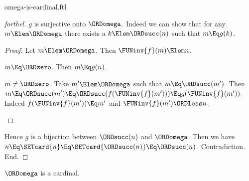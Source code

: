 \documentclass{stex}
\begin{document}
\begin{smodule}{omega-is-cardinal.ftl}
\begin{proof}[forthel]
    $g$ is surjective onto $\ORDomega$.
    Indeed we can show that for any $m \Elem \ORDomega$ there exists a $k \Elem \ORDsucc(n)$ such that $m \Eq g(k)$.
    \begin{proof}
      Let $m \Elem \ORDomega$.
      Then $\FUNinv{f}(m) \Elem n$.

      \begin{case}{$m \Eq \ORDzero$.}
        Then $m \Eq g(n)$.
      \end{case}

      \begin{case}{$m \neq \ORDzero$.}
        Take $m' \Elem \ORDomega$ such that $m \Eq \ORDsucc(m')$.
        Then $m
          \Eq \ORDsucc(m')
          \Eq \ORDsucc(f(\FUNinv{f}(m')))
          \Eq g(\FUNinv{f}(m'))$.
        Indeed $f(\FUNinv{f}(m')) \Eq m'$ and $\FUNinv{f}(m') \ORDless n$.
      \end{case}
    \end{proof}

    Hence $g$ is a bijection between $\ORDsucc(n)$ and $\ORDomega$.
    Then we have $n
      \Eq \SETcard{n}
      \Eq \SETcard{\ORDsucc(n)}
      \Eq \ORDsucc(n)$.
    Contradiction.
  End.
\end{proof}

\begin{corollary}[forthel]
  $\ORDomega$ is a cardinal.
\end{corollary}
\end{smodule}
\end{document}
